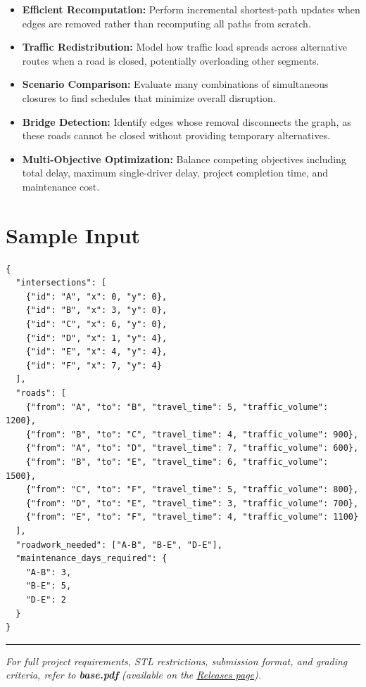\begin{itemize}
  \item \textbf{Efficient Recomputation:} Perform incremental shortest-path updates when edges are removed rather than recomputing all paths from scratch.
  \item \textbf{Traffic Redistribution:} Model how traffic load spreads across alternative routes when a road is closed, potentially overloading other segments.
  \item \textbf{Scenario Comparison:} Evaluate many combinations of simultaneous closures to find schedules that minimize overall disruption.
  \item \textbf{Bridge Detection:} Identify edges whose removal disconnects the graph, as these roads cannot be closed without providing temporary alternatives.
  \item \textbf{Multi-Objective Optimization:} Balance competing objectives including total delay, maximum single-driver delay, project completion time, and maintenance cost.
\end{itemize}

\section{Sample Input}

\begin{lstlisting}[style=json, caption={data/input\_sample.json}]
{
  "intersections": [
    {"id": "A", "x": 0, "y": 0},
    {"id": "B", "x": 3, "y": 0},
    {"id": "C", "x": 6, "y": 0},
    {"id": "D", "x": 1, "y": 4},
    {"id": "E", "x": 4, "y": 4},
    {"id": "F", "x": 7, "y": 4}
  ],
  "roads": [
    {"from": "A", "to": "B", "travel_time": 5, "traffic_volume": 1200},
    {"from": "B", "to": "C", "travel_time": 4, "traffic_volume": 900},
    {"from": "A", "to": "D", "travel_time": 7, "traffic_volume": 600},
    {"from": "B", "to": "E", "travel_time": 6, "traffic_volume": 1500},
    {"from": "C", "to": "F", "travel_time": 5, "traffic_volume": 800},
    {"from": "D", "to": "E", "travel_time": 3, "traffic_volume": 700},
    {"from": "E", "to": "F", "travel_time": 4, "traffic_volume": 1100}
  ],
  "roadwork_needed": ["A-B", "B-E", "D-E"],
  "maintenance_days_required": {
    "A-B": 3,
    "B-E": 5,
    "D-E": 2
  }
}
\end{lstlisting}

\vfill
\noindent\rule{\textwidth}{0.4pt}
{\small\textit{For full project requirements, STL restrictions, submission format, and grading criteria, refer to \textbf{base.pdf} (available on the \href{https://github.com/BestSithInEU/cse211-term-projects/releases}{Releases page}).}}
